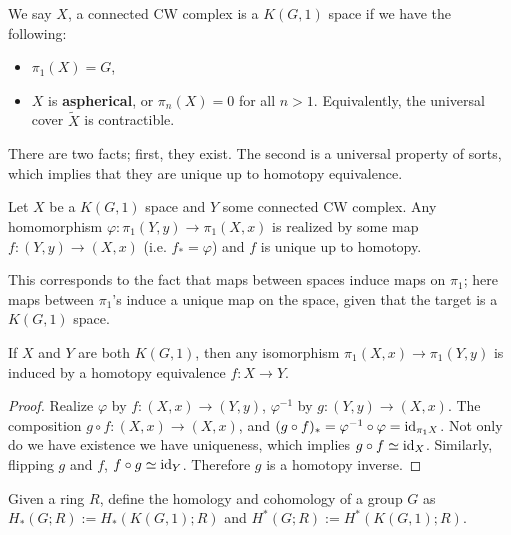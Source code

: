 \begin{definition}[]
    We say $X$, a connected CW complex is a $K(G,1)$ space if we have the following:
    \begin{itemize}
    \setlength\itemsep{-.2em}
\item $\pi_1(X)=G$,
\item $X$ is \textbf{aspherical}, or $\pi_n (X)=0$ for all $n>1$. Equivalently, the universal cover $\widetilde X$ is contractible.
    \end{itemize}
    There are two facts; first, they exist. The second is a universal property of sorts, which implies that they are unique up to homotopy equivalence.
\end{definition}
\begin{lemma}
    Let $X$ be a $K(G,1)$ space and $Y$ some connected CW complex. Any homomorphism $\varphi  \colon \pi_1(Y,y) \to \pi_1(X,x)$ is realized by some map $f \colon (Y,y) \to (X,x)$ (i.e. $f_*= \varphi $) and $f$ is unique up to homotopy.
\end{lemma}
This corresponds to the fact that maps between spaces induce maps on $\pi_1$;  here maps between $\pi_1$'s induce a unique map on the space, given that the target is a $K(G,1)$ space.
\begin{cor}
    If $X$ and $Y$ are both $K(G,1)$, then any isomorphism $\pi_1(X,x) \to \pi_1(Y,y)$ is induced by a homotopy equivalence $f \colon X \to Y$.
\end{cor}
\begin{proof}
    Realize $\varphi $ by $f \colon (X,x) \to (Y,y)$, $\varphi ^{-1}$ by $g \colon (Y,y) \to (X,x)$. The composition $g \circ f \colon (X,x) \to (X,x)$, and $(g \circ f) _* = \varphi  ^{-1} \circ \varphi =\operatorname{id} _{\pi_1 X}$. Not only do we have existence we have uniqueness, which implies $g \circ f \simeq  \operatorname{id}_X$. Similarly, flipping $g$ and $f$, $f \circ g\simeq \operatorname{id}_Y$. Therefore $g$ is a homotopy inverse.
\end{proof}
\begin{definition}[]
    Given a ring $R$, define the homology and cohomology of a group $G$ as $H_*(G;R):=H_*(K(G,1);R)$ and $H^*(G;R):= H^*(K(G,1);R)$.
\end{definition}
